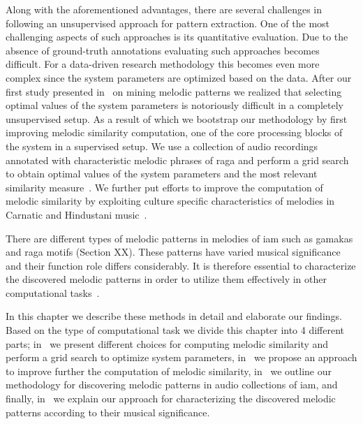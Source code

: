 Along with the aforementioned advantages, there are several challenges in following an unsupervised approach for pattern extraction. One of the most challenging aspects of such approaches is its quantitative evaluation. Due to the absence of ground-truth annotations evaluating such approaches becomes difficult. For a data-driven research methodology this becomes even more complex since the system parameters are optimized based on the data. After our first study presented in~\cite{gulati_SITIS_2014} on mining melodic patterns we realized that selecting optimal values of the system parameters is notoriously difficult in a completely unsupervised setup. As a result of which we bootstrap our methodology by first improving melodic similarity computation, one of the core processing blocks of the system in a supervised setup. We use a collection of audio recordings annotated with characteristic melodic phrases of \gls{raga} and perform a grid search to obtain optimal values of the system parameters and the most relevant similarity measure~\citep{gulati_ICASSP2015}. We further put efforts to improve the computation of melodic similarity by exploiting culture specific characteristics of melodies in Carnatic and Hindustani music~\citep{gulati_ISMIR_2015}.

There are different types of melodic patterns in melodies of \gls{iam} such as gamakas and \gls{raga} motifs (Section XX). These patterns have varied musical significance and their function role differs considerably. It is therefore essential to characterize the discovered melodic patterns in order to utilize them effectively in other computational tasks~\citep{gulati_communities_2016}.

In this chapter we describe these methods in detail and elaborate our findings. Based on the type of computational task we divide this chapter into 4 different parts; in~ we present different choices for computing melodic similarity and perform a grid search to optimize system parameters, in~ we propose an approach to improve further the computation of melodic similarity, in~ we outline our methodology for discovering melodic patterns in audio collections of \gls{iam}, and finally, in~ we explain our approach for characterizing the discovered melodic patterns according to their musical significance. 

